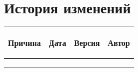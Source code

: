 
\def \notincludehead{}
\def \maindoc{}








\section*{История изменений}
\noindent

\scriptsize
\begin{longtable}{|p{40mm}|p{20mm}|p{20mm}|p{60mm}|}
\hline
{\bf \parbox[c][5mm]{40mm}{\raggedright Причина}} & {\bf \parbox[c]{19mm}{\raggedright Дата}} & {\bf \parbox[c]{16mm}{\raggedright Версия}} & {\bf \parbox[c]{25mm}{\raggedright Автор}} \\
\hline
\hline
&&&\\
\hline
&&&\\
\hline
&&&\\
\hline
\end{longtable}  
\normalsize

\newpage

\footnotesize
\tableofcontents
\normalsize
\newpage








